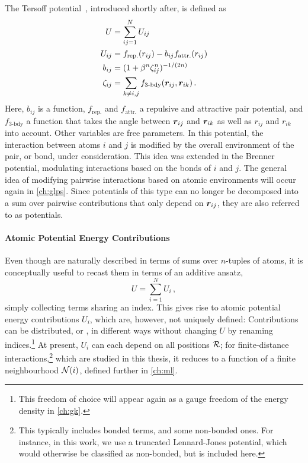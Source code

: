 The Tersoff potential~\cite{t1988p}, introduced shortly after, is defined as 
\begin{align}
	U &= \sum_{ij=1}^N U_{ij} \\
    U_{ij} &= f_{\text{rep.}}(r_{ij}) - b_{ij} f_{\text{attr.}}(r_{ij}) \\
    b_{ij} &= (1 + \beta^n \zeta_{ij}^n)^{-1/(2n)} \\
    \zeta_{ij} &= \sum_{k \neq i,j} f_{\text{3-bdy}}(\boldsymbol{r}_{ij}, \boldsymbol{r}_{ik}) \, .
\end{align}
Here, $b_{ij}$ is a  function, $f_{\text{rep.}}$ and $f_{\text{attr.}}$ a repulsive and attractive pair potential, and $f_{\text{3-bdy}}$ a function that takes the angle between $\boldsymbol{r}_{ij}$ and $\boldsymbol{r}_{ik}$ as well as $r_{ij}$ and $r_{ik}$ into account. Other variables are free parameters.
In this potential, the interaction between atoms $i$ and $j$ is modified by the overall environment of the pair, or bond, under consideration. This idea was extended in the Brenner~\cite{b1990p} potential, modulating interactions based on the bonds of $i$ and $j$. The general idea of modifying pairwise interactions based on atomic environments will occur again in \cref{ch:glps}.
Since potentials of this type can no longer be decomposed into a sum over pairwise contributions that only depend on $\boldsymbol{r}_{ij}$, they are also referred to as  potentials.

\paragraph{Atomic Potential Energy Contributions} Even though \ffs are naturally described in terms of sums over $n$-tuples of atoms, it is conceptually useful to recast them in terms of an additive ansatz,
\begin{equation}
	\label{eq:ff-ui}
	U = \sum_{i=1}^N U_i \, ,
\end{equation}
simply collecting terms sharing an index. This gives rise to atomic potential energy contributions $U_i$, which are, however, not uniquely defined: Contributions can be distributed, or , in different ways without changing $U$ by renaming indices.\footnote{This freedom of choice will appear again as a gauge freedom of the energy density in \cref{ch:gk}.} At present, $U_i$ can each depend on all positions $\mathcal{R}$; for finite-distance interactions,\footnote{This typically includes bonded terms, and some non-bonded ones. For instance, in this work, we use a truncated Lennard-Jones potential, which would otherwise be classified as non-bonded, but is included here.} which are studied in this thesis, it reduces to a function of a finite neighbourhood $\mathcal{N}(i)$, defined further in \cref{ch:ml}.


